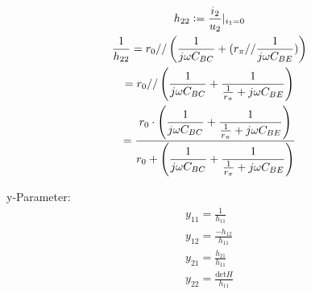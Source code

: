 \begin{gather*}
  h_{22} \vcentcolon= \frac{i_2}{u_2}\rvert_{i_1=0}\\
  \frac{1}{h_{22}}=r_0//\left(\frac{1}{j\omega C_{BC}} + (r_\pi //
    \frac{1}{j\omega C_{BE}})\right)\\
  = r_0 // \left( \frac{1}{j\omega C_{BC}} + \dfrac{1}{\frac{1}{r_\pi} + j\omega C_{BE}} \right)\\
  = \frac{r_0 \cdot \left( \dfrac{1}{j\omega C_{BC}} + \dfrac{1}{\frac{1}{r_\pi}
        + j\omega C_{BE}} \right)}{ r_0 + \left( \dfrac{1}{j\omega C_{BC}} +
      \dfrac{1}{\frac{1}{r_\pi} + j\omega C_{BE}} \right)}
\end{gather*}


\noindent y-Parameter:
\begin{gather*}
  y_{11}=\frac{1}{h_{11}}\\
  y_{12}=\frac{-h_{12}}{h_{11}}\\
  y_{21}=\frac{h_{21}}{h_{11}}\\
  y_{22}=\frac{\textrm{det} H }{h_{11}}
\end{gather*}